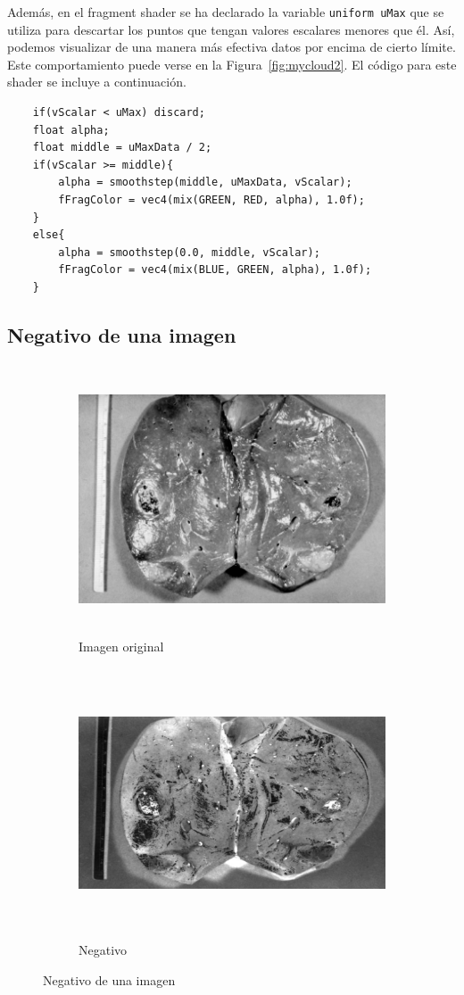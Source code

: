 Además, en el fragment shader se ha declarado la variable \verb|uniform uMax|
que se utiliza para descartar los puntos que tengan valores escalares menores
que él. Así, podemos visualizar de una manera  más efectiva datos por encima de
cierto límite. Este comportamiento puede verse en la Figura~\ref{fig:mycloud2}.
El código para este shader se incluye a continuación.

\begin{verbatim}
    if(vScalar < uMax) discard;	
    float alpha;
    float middle = uMaxData / 2;
    if(vScalar >= middle){
        alpha = smoothstep(middle, uMaxData, vScalar);
        fFragColor = vec4(mix(GREEN, RED, alpha), 1.0f);
    }
    else{
        alpha = smoothstep(0.0, middle, vScalar);
        fFragColor = vec4(mix(BLUE, GREEN, alpha), 1.0f);
    }
\end{verbatim}

\subsection{Negativo de una imagen}
\label{makereference5.5.6}

\begin{figure}[h]
	\centering	
	\begin{subfigure}{0.45\textwidth}
		\includegraphics[height=8cm,width=\textwidth]{figures/mynegative0.jpg}
		\caption{Imagen original}
	\end{subfigure}
	\hfill
	\begin{subfigure}{0.45\textwidth}
		\includegraphics[height=8cm,width=\textwidth]{figures/mynegative1.png}
		\caption{Negativo}
	\end{subfigure}
	\caption{Negativo de una imagen}
	\label{fig:mynegative}
\end{figure}

